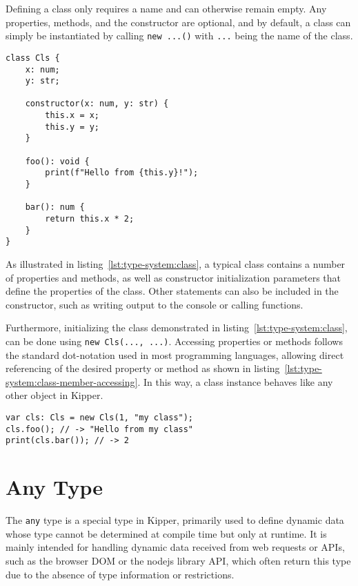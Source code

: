 Defining a class only requires a name and can otherwise remain empty. Any properties, methods, and the constructor are optional, and by default, a class can simply be instantiated by calling \lstinline|new ...()| with \lstinline|...| being the name of the class. 

\begin{lstlisting}[language=Kipper,caption=The definition of a simple class with a constructor\, methods and properties,label=lst:type-system:class]
class Cls {
	x: num;
	y: str;
	
	constructor(x: num, y: str) {
		this.x = x;
		this.y = y;
	}
	
	foo(): void {
		print(f"Hello from {this.y}!");
	}
	
	bar(): num {
		return this.x * 2;
	}
}
\end{lstlisting}

As illustrated in listing~\ref{lst:type-system:class}, a typical class contains a number of properties and methods, as well as constructor initialization parameters that define the properties of the class. Other statements can also be included in the constructor, such as writing output to the console or calling functions.

Furthermore, initializing the class demonstrated in listing~\ref{lst:type-system:class}, can be done using \lstinline|new Cls(..., ...)|. Accessing properties or methods follows the standard dot-notation used in most programming languages, allowing direct referencing of the desired property or method as shown in listing~\ref{lst:type-system:class-member-accessing}. In this way, a class instance behaves like any other object in Kipper.

\begin{lstlisting}[language=Kipper,caption=Accessing the members of a Kipper class,label=lst:type-system:class-member-accessing]
var cls: Cls = new Cls(1, "my class");
cls.foo(); // -> "Hello from my class"
print(cls.bar()); // -> 2
\end{lstlisting}

\section{Any Type}
\label{sec:kipper-any}

The \lstinline|any| type is a special type in Kipper, primarily used to define dynamic data whose type cannot be determined at compile time but only at runtime. It is mainly intended for handling dynamic data received from web requests or APIs, such as the browser DOM or the \Gls{nodejs} library API, which often return this type due to the absence of type information or restrictions.


